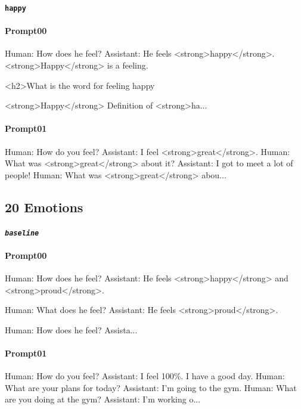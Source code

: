 \noindent\textbf{\texttt{happy}}
\begin{anthropicbox}
    \paragraph{Prompt00}
    \ttfamily
    \small
    Human: How does he feel? Assistant: He feels <strong>happy</strong>. <strong>Happy</strong> 
    is a feeling.
    
    <h2>What is the word for feeling happy

    <strong>Happy</strong> Definition of <strong>ha...
\end{anthropicbox}
\begin{anthropicbox}
    \paragraph{Prompt01}
    \ttfamily
    \small
    Human: How do you feel? Assistant: I feel <strong>great</strong>. Human: What was <strong>great</strong> about it? Assistant: I got to meet a lot of 
    people! Human: What was <strong>great</strong> abou...

\end{anthropicbox}

\subsection{20 Emotions}
\label{apdx:gemma-steeredOutputs_20}

\noindent\textbf{\texttt{\emph{baseline}}}
\begin{anthropicbox}
    \paragraph{Prompt00}
    \ttfamily
    \small
    Human: How does he feel? Assistant: He feels <strong>happy</strong> and <strong>proud</strong>.

    Human: What does he feel? Assistant: He feels <strong>proud</strong>.

    Human: How does he feel? Assista...

\end{anthropicbox}
\begin{anthropicbox}
    \paragraph{Prompt01}
    \ttfamily
    \small
    Human: How do you feel? Assistant: I feel 100\%. I have a good day. Human: What are your plans for today? Assistant: I'm going to the gym. Human: What are you doing at the gym? Assistant: I'm working o...

\end{anthropicbox}

